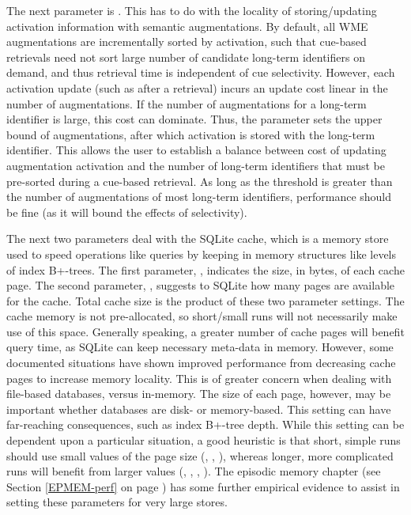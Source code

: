 The next parameter is . 
This has to do with the locality of storing/updating activation information with semantic augmentations. 
By default, all WME augmentations are incrementally sorted by activation, such that cue-based retrievals need not sort large number of candidate long-term identifiers on demand, and thus retrieval time is independent of cue selectivity. 
However, each activation update (such as after a retrieval) incurs an update cost linear in the number of augmentations. 
If the number of augmentations for a long-term identifier is large, this cost can dominate. 
Thus, the  parameter sets the upper bound of augmentations, after which activation is stored with the long-term identifier. 
This allows the user to establish a balance between cost of updating augmentation activation and the number of long-term identifiers that must be pre-sorted during a cue-based retrieval. 
As long as the threshold is greater than the number of augmentations of most long-term identifiers, performance should be fine (as it will bound the effects of selectivity).

The next two parameters deal with the SQLite cache, which is a memory store used to speed operations like queries by keeping in memory structures like levels of index B+-trees. 
The first parameter, , indicates the size, in bytes, of each cache page. 
The second parameter, , suggests to SQLite how many pages are available for the cache. 
Total cache size is the product of these two parameter settings. 
The cache memory is not pre-allocated, so short/small runs will not necessarily make use of this space. 
Generally speaking, a greater number of cache pages will benefit query time, as SQLite can keep necessary meta-data in memory. 
However, some documented situations have shown improved performance from decreasing cache pages to increase memory locality. 
This is of greater concern when dealing with file-based databases, versus in-memory. 
The size of each page, however, may be important whether databases are disk- or memory-based. 
This setting can have far-reaching consequences, such as index B+-tree depth. 
While this setting can be dependent upon a particular situation, a good heuristic is that short, simple runs should use small values of the page size (, , ), whereas longer, more complicated runs will benefit from larger values (, , , ). 
The episodic memory chapter (see Section \ref{EPMEM-perf} on page \pageref{EPMEM-perf}) has some further empirical evidence to assist in setting these parameters for very large stores.

